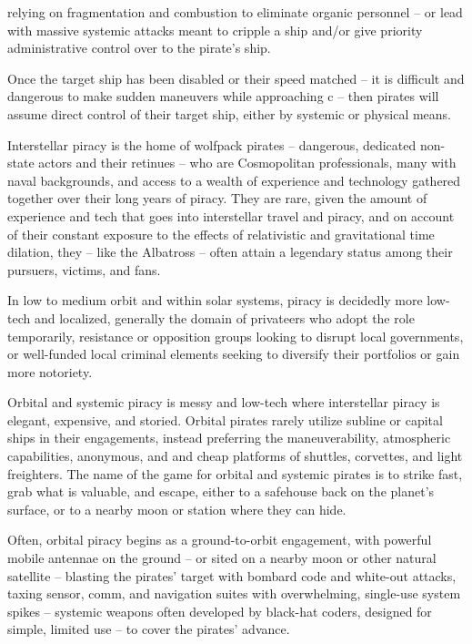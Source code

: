 relying on fragmentation and combustion to eliminate organic personnel -- or lead with massive  
systemic attacks meant to cripple a ship and/or give priority administrative control over to the  
pirate’s ship.   

Once the target ship has been disabled or their speed matched -- it is difficult and dangerous to  
make sudden maneuvers while approaching c -- then pirates will assume direct control of their  
target ship, either by systemic or physical means.   

Interstellar piracy is the home of wolfpack pirates -- dangerous, dedicated non-state actors and  
their retinues -- who are Cosmopolitan professionals, many with naval backgrounds, and access  
to a wealth of experience and technology gathered together over their long years of piracy. They  
are rare, given the amount of experience and tech that goes into interstellar travel and piracy, and  
on account of their constant exposure to the effects of relativistic and gravitational time dilation,  
they  -- like the Albatross -- often attain a legendary status among their pursuers, victims, and  
fans.   

In low to medium orbit and within solar systems, piracy is decidedly more low-tech and localized,  
generally the domain of privateers who adopt the role temporarily, resistance or opposition groups  
looking to disrupt local governments, or well-funded local criminal elements seeking to diversify  
their portfolios or gain more notoriety.   

Orbital and systemic piracy is messy and low-tech where interstellar piracy is elegant, expensive,  
and storied. Orbital pirates rarely utilize subline or capital ships in their engagements, instead  
preferring the maneuverability, atmospheric capabilities, anonymous, and and cheap platforms of  
shuttles, corvettes, and light freighters. The name of the game for orbital and systemic pirates is  
to strike fast, grab what is valuable, and escape, either to a safehouse back on the planet’s  
surface, or to a nearby moon or station where they can hide.   

Often, orbital piracy begins as a ground-to-orbit engagement, with powerful mobile antennae on  
the ground -- or sited on a nearby moon or other natural satellite -- blasting the pirates’ target with  
bombard code and white-out attacks, taxing sensor, comm, and navigation suites with  
overwhelming, single-use system spikes -- systemic weapons often developed by black-hat  
coders, designed for simple, limited use -- to cover the pirates’ advance.   

